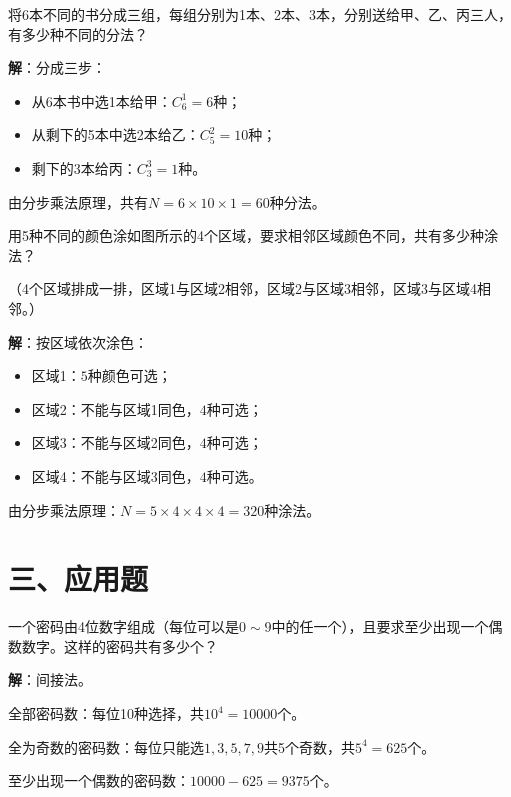 \documentclass[12pt, a4paper]{ctexart}
\begin{document}
\begin{examplebox}
将6本不同的书分成三组，每组分别为1本、2本、3本，分别送给甲、乙、丙三人，有多少种不同的分法？

\textbf{解}：分成三步：
\begin{itemize}
  \item 从6本书中选1本给甲：$C_6^1 = 6$种；
  \item 从剩下的5本中选2本给乙：$C_5^2 = 10$种；
  \item 剩下的3本给丙：$C_3^3 = 1$种。
\end{itemize}
由分步乘法原理，共有$N = 6 \times 10 \times 1 = 60$种分法。
\end{examplebox}

\begin{examplebox}
用5种不同的颜色涂如图所示的4个区域，要求相邻区域颜色不同，共有多少种涂法？

（4个区域排成一排，区域1与区域2相邻，区域2与区域3相邻，区域3与区域4相邻。）

\textbf{解}：按区域依次涂色：
\begin{itemize}
  \item 区域1：$5$种颜色可选；
  \item 区域2：不能与区域1同色，$4$种可选；
  \item 区域3：不能与区域2同色，$4$种可选；
  \item 区域4：不能与区域3同色，$4$种可选。
\end{itemize}
由分步乘法原理：$N = 5 \times 4 \times 4 \times 4 = 320$种涂法。
\end{examplebox}

\vspace{8pt}
\section*{\textcolor{apppurple}{三、应用题}}

\begin{appbox}[【应用1】密码设置问题]
一个密码由4位数字组成（每位可以是$0 \sim 9$中的任一个），且要求至少出现一个偶数数字。这样的密码共有多少个？

\textbf{解}：间接法。

全部密码数：每位10种选择，共$10^4 = 10000$个。

全为奇数的密码数：每位只能选$1, 3, 5, 7, 9$共5个奇数，共$5^4 = 625$个。

至少出现一个偶数的密码数：$10000 - 625 = 9375$个。
\end{appbox}
\end{document}
